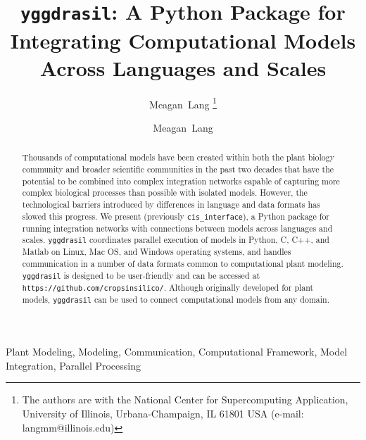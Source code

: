 \documentclass[journal]{IEEEtran}
\newcommand{\todo}[1]{{\color{red}{#1}}}
\newcommand{\pkg}{{\tt yggdrasil}{}}
\newcommand{\cis}{{\tt cis\_interface}{}}
\newcommand{\pkglink}{\todo{cis\_interface}}
\newcommand{\hrefgit}[1]{\href{https://github.com/cropsinsilico/yggdrasil}{\todo{#1}}}
\begin{document}
\ifieee
\else
	\shorttitle{{\pkg}}
\fi

\title{{\pkg}: A Python Package for Integrating Computational Models Across Languages and Scales}

\ifieee
	\author{Meagan~Lang%
	\thanks{The authors are with the National Center for Supercomputing Application, University of Illinois, Urbana-Champaign, IL 61801 USA (e-mail: langmm@illinois.edu)}}
\else
	\author{Meagan~Lang}

\fi


\ifieee
	\maketitle
\fi

\begin{abstract}
Thousands of computational models have been created within both the plant biology community and broader scientific communities in the past two decades that have the potential to be combined into complex integration networks capable of capturing more complex biological processes than possible with isolated models. However, the technological barriers introduced by differences in language and data formats has slowed this progress. We present \hrefgit{\pkg} (previously {\cis}), a Python package for running integration networks with connections between models across languages and scales. {\pkg} coordinates parallel execution of models in Python, C, C++, and Matlab on Linux, Mac OS, and Windows operating systems, and handles communication in a number of data formats common to computational plant modeling. {\pkg} is designed to be user-friendly and can be accessed at {\tt https://github.com/cropsinsilico/\pkglink}. Although originally developed for plant models, {\pkg} can be used to connect computational models from any domain.
\end{abstract}

\ifieee
	\begin{IEEEkeywords}
		Plant Modeling, Modeling, Communication, Computational Framework, Model Integration, Parallel Processing
	\end{IEEEkeywords}
	\IEEEpeerreviewmaketitle
\else
	\maketitle
\fi
\end{document}

